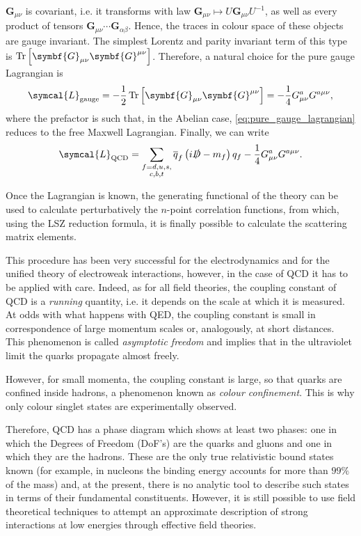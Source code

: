 $\symbf{G}_{\mu \nu}$ is covariant, i.e. it transforms with law $\symbf{G}_{\mu \nu} \mapsto U \symbf{G}_{\mu \nu} U^{-1}$, as well as every product of tensors $\symbf{G}_{\mu \nu} \cdots \symbf{G}_{\alpha \beta}$. Hence, the traces in colour space of these objects are gauge invariant. The simplest Lorentz and parity invariant term of this type is $\tr{\left[ \symbf{G}_{\mu \nu} \symbf{G}^{\mu \nu} \right]}$. Therefore, a natural choice for the pure gauge Lagrangian is
\begin{equation}
  \symcal{L}_\text{gauge} = - \frac{1}{2} \tr{\left[ \symbf{G}_{\mu \nu} \symbf{G}^{\mu \nu} \right]} = - \frac{1}{4} G^a_{\mu \nu} G^{a \mu \nu},
  \label{eq:pure_gauge_lagrangian}
\end{equation}
where the prefactor is such that, in the Abelian case, \eqref{eq:pure_gauge_lagrangian} reduces to the free Maxwell Lagrangian. Finally, we can write
\begin{equation}
  \symcal{L}_\text{QCD} = \sum_{\substack{f = d, u, s, \\ c, b, t}} \adj{q}_f \left( i \slashed{D} - m_f \right) q_f - \frac{1}{4} G^a_{\mu \nu} G^{a \mu \nu} .
\end{equation}

Once the Lagrangian is known, the generating functional of the theory can be used to calculate perturbatively the $n$-point correlation functions, from which, using the LSZ reduction formula, it is finally possible to calculate the scattering matrix elements.

This procedure has been very successful for the electrodynamics and for the unified theory of electroweak interactions, however, in the case of QCD it has to be applied with care. Indeed, as for all field theories, the coupling constant of QCD is a \emph{running} quantity, i.e. it depends on the scale at which it is measured. At odds with what happens with QED, the coupling constant is small in correspondence of large momentum scales or, analogously, at short distances. This phenomenon is called \emph{asymptotic freedom} and implies that in the ultraviolet limit the quarks propagate almost freely. 

However, for small momenta, the coupling constant is large, so that quarks are confined inside hadrons, a phenomenon known as \emph{colour confinement}. This is why only colour singlet states are experimentally observed.

Therefore, QCD has a phase diagram which shows at least two phases: one in which the Degrees of Freedom (DoF's) are the quarks and gluons and one in which they are the hadrons. These are the only true relativistic bound states known (for example, in nucleons the binding energy accounts for more than $99\%$ of the mass) and, at the present, there is no analytic tool to describe such states in terms of their fundamental constituents. However, it is still possible to use field theoretical techniques to attempt an approximate description of strong interactions at low energies through effective field theories.

